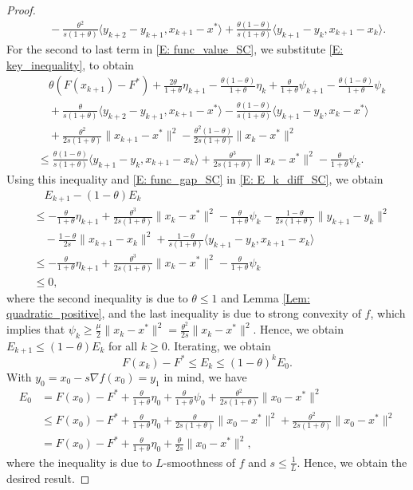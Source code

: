 \documentclass[10pt,a4paper]{amsart}
\begin{document}
\begin{proof}
\begin{equation}
\begin{aligned}
&\quad -\frac{\theta^2}{s(1+\theta)}\langle y_{k+2}-y_{k+1}, x_{k+1}-x^* \rangle
   + \frac{\theta(1-\theta)}{s(1+\theta)}\langle y_{k+1}-y_k, x_{k+1}-x_k \rangle. 
\end{aligned}
\end{equation}
For the second to last term in \eqref{E: func_value_SC}, we substitute \eqref{E: key_inequality}, to obtain
\begin{align*}
&\quad \theta\left( F(x_{k+1}) - F^* \right) + \frac{2\theta}{1+\theta}\eta_{k+1} - \frac{\theta(1-\theta)}{1+\theta}\eta_k 
   + \frac{\theta}{1+\theta}\psi_{k+1}
   - \frac{\theta(1-\theta)}{1+\theta}\psi_k \\
&\quad +\frac{\theta}{s(1+\theta)}\langle y_{k+2}-y_{k+1}, x_{k+1}-x^* \rangle
   - \frac{\theta(1-\theta)}{s(1+\theta)}\langle y_{k+1}-y_k, x_k-x^* \rangle \\
&\quad + \frac{\theta^2}{2s(1+\theta)}\| x_{k+1} - x^* \|^2
   - \frac{\theta^2(1-\theta)}{2s(1+\theta)}\| x_k - x^* \|^2 \\
&\le \frac{\theta(1-\theta)}{s(1+\theta)}\langle y_{k+1}-y_k, x_{k+1}-x_k \rangle
   + \frac{\theta^3}{2s(1+\theta)}\| x_k - x^* \|^2 
   - \frac{\theta}{1+\theta}\psi_k. 
\end{align*}
Using this inequality and \eqref{E: func_gap_SC} in \eqref{E: E_k_diff_SC}, we obtain
\begin{align*}
&\quad E_{k+1}-(1-\theta)E_k \\
&\le - \frac{\theta}{1+\theta}\eta_{k+1}
     + \frac{\theta^3}{2s(1+\theta)}\| x_k - x^* \|^2
     - \frac{\theta}{1+\theta}\psi_k 
     - \frac{1-\theta}{2s(1+\theta)}\| y_{k+1} - y_k \|^2\\
&\quad  
    - \frac{1-\theta}{2s}\| x_{k+1}-x_k \|^2   
    + \frac{1-\theta}{s(1+\theta)}\langle y_{k+1}-y_k, x_{k+1}-x_k \rangle \\
&\le - \frac{\theta}{1+\theta}\eta_{k+1}
     + \frac{\theta^3}{2s(1+\theta)}\| x_k - x^* \|^2
     - \frac{\theta}{1+\theta}\psi_k\\
&\le 0,   
\end{align*}
where the second inequality is due to $\theta\le 1$ and Lemma \ref{Lem: quadratic_positive}, and the last inequality is due to strong convexity of $f$, which implies that $\psi_k \ge \frac{\mu}{2}\| x_k - x^* \|^2 = \frac{\theta^2}{2s}\| x_k - x^* \|^2$. Hence, we obtain $E_{k+1} \le (1-\theta)E_k$ for all $k\ge 0$. Iterating, we obtain
$$ F(x_k) - F^* \le E_k \le (1-\theta)^kE_0. $$ 
With $y_0 = x_0-s\nabla f(x_0)=y_1$ in mind, we have
\begin{align*}
E_0
&= F(x_0) - F^* + \frac{\theta}{1+\theta}\eta_0 + \frac{\theta}{1+\theta}\psi_0 + \frac{\theta^2 }{2s(1+\theta)}\| x_0 - x^* \|^2 \\
&\le F(x_0) - F^* + \frac{\theta}{1+\theta}\eta_0 + \frac{\theta}{2s(1+\theta)}\| x_0 - x^* \|^2 
 + \frac{\theta^2 }{2s(1+\theta)}\| x_0 - x^* \|^2 \\
&= F(x_0) - F^* + \frac{\theta}{1+\theta}\eta_0 + \frac{\theta}{2s}\| x_0 - x^* \|^2,    
\end{align*}
where the inequality is due to $L$-smoothness of $f$ and $s\le \frac{1}{L}$. Hence, we obtain the desired result.
\end{proof}
\end{document}

